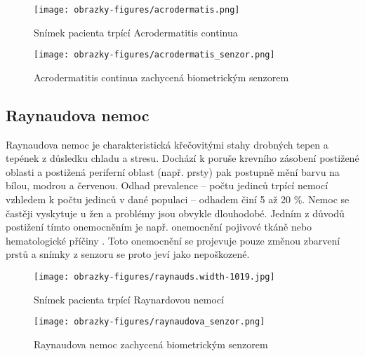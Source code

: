 \begin{figure}[!htbp]
  \begin{minipage}[b]{0.5\linewidth}
    \centering
    \texttt{[image: obrazky-figures/acrodermatis.png]}
    \caption{Snímek pacienta trpící Acrodermatitis continua \cite{AcrodermatitisContinua}}
  \end{minipage}
  \hspace{0.5cm}
  \begin{minipage}[b]{0.5\linewidth}
    \centering
    \texttt{[image: obrazky-figures/acrodermatis\_senzor.png]}
    \caption{Acrodermatitis continua zachycená biometrickým senzorem \cite{Barotova}}
  \end{minipage}
\end{figure}

\subsection*{Raynaudova nemoc}
Raynaudova nemoc je charakteristická křečovitými stahy drobných tepen a tepének z důsledku chladu a stresu. Dochází k poruše krevního zásobení postižené oblasti a postižená periferní oblast (např. prsty) pak postupně mění barvu na bílou, modrou a červenou. Odhad prevalence -- počtu jedinců trpící nemocí vzhledem k počtu jedinců v dané populaci -- odhadem činí 5 až 20 \%. Nemoc se častěji vyskytuje u žen a problémy jsou obvykle dlouhodobé. Jedním z důvodů postižení tímto onemocněním je např. onemocnění pojivové tkáně nebo hematologické příčiny \cite{InfluenceSkinDiseases}. Toto onemocnění se projevuje pouze změnou zbarvení prstů a snímky z senzoru se proto jeví jako nepoškozené.

\begin{figure}[!htbp]
  \begin{minipage}[b]{0.5\linewidth}
    \centering
    \texttt{[image: obrazky-figures/raynauds.width-1019.jpg]}
    \caption{Snímek pacienta trpící Raynardovou nemocí \cite{NHSRaynauds}}
  \end{minipage}
  \hspace{0.5cm}
  \begin{minipage}[b]{0.5\linewidth}
    \centering
    \texttt{[image: obrazky-figures/raynaudova\_senzor.png]}
    \caption{Raynaudova nemoc zachycená biometrickým senzorem \cite{Barotova}}
  \end{minipage}
\end{figure}
